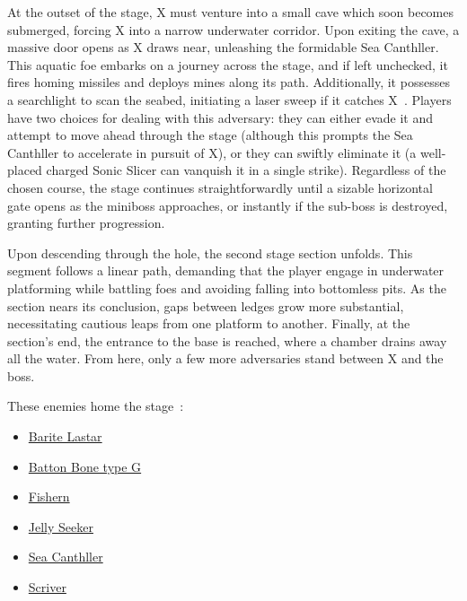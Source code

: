 At the outset of the stage, X must venture into a small cave which soon becomes submerged, forcing X into a narrow underwater corridor. Upon exiting the cave, a massive door opens as X draws near, unleashing the formidable Sea Canthller. This aquatic foe embarks on a journey across the stage, and if left unchecked, it fires homing missiles and deploys mines along its path. Additionally, it possesses a searchlight to scan the seabed, initiating a laser sweep if it catches X~\cite{wiki:Sea_Canthller}. Players have two choices for dealing with this adversary: they can either evade it and attempt to move ahead through the stage (although this prompts the Sea Canthller to accelerate in pursuit of X), or they can swiftly eliminate it (a well-placed charged Sonic Slicer can vanquish it in a single strike). Regardless of the chosen course, the stage continues straightforwardly until a sizable horizontal gate opens as the miniboss approaches, or instantly if the sub-boss is destroyed, granting further progression.

Upon descending through the hole, the second stage section unfolds. This segment follows a linear path, demanding that the player engage in underwater platforming while battling foes and avoiding falling into bottomless pits. As the section nears its conclusion, gaps between ledges grow more substantial, necessitating cautious leaps from one platform to another. Finally, at the section's end, the entrance to the base is reached, where a chamber drains away all the water. From here, only a few more adversaries stand between X and the boss.

These enemies home the stage~\cite{wiki:Deep_sea}:
\begin{itemize}
	\item \hyperlink {enem:Barite_Lastar}{Barite Lastar}
	\item \hyperlink {enem:Batton_Bone_type_G}{Batton Bone type G}
	\item \hyperlink {enem:Fishern}{Fishern}
	\item \hyperlink {enem:Jelly_Seeker}{Jelly Seeker}
	\item \hyperlink {miniboss:Sea_Canthller}{Sea Canthller}
	\item \hyperlink {enem:Scriver}{Scriver}
\end{itemize}

